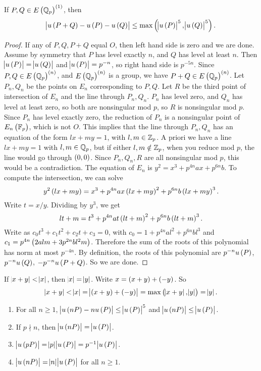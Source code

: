 \begin{lemma}
\label{lem:7.5}
If $ P, Q \in E\br{\Q_p}^{\br{1}} $, then
$$ \abs{u\br{P + Q} - u\br{P} - u\br{Q}} \le \max\br{\abs{u\br{P}}^5, \abs{u\br{Q}}^5}. $$
\end{lemma}

\begin{proof}
If any of $ P, Q, P + Q $ equal $ O $, then left hand side is zero and we are done. Assume by symmetry that $ P $ has level exactly $ n $, and $ Q $ has level at least $ n $. Then $ \abs{u\br{P}} = \abs{u\br{Q}} $ and $ \abs{u\br{P}} = p^{-n} $, so right hand side is $ p^{-5n} $. Since $ P, Q \in E\br{\Q_p}^{\br{n}} $, and $ E\br{\Q_p}^{\br{n}} $ is a group, we have $ P + Q \in E\br{\Q_p}^{\br{n}} $. Let $ P_n, Q_n $ be the points on $ E_n $ corresponding to $ P, Q $. Let $ R $ be the third point of intersection of $ E_n $ and the line through $ P_n, Q_n $. $ P_n $ has level zero, and $ Q_n $ has level at least zero, so both are nonsingular mod $ p $, so $ R $ is nonsingular mod $ p $. Since $ P_n $ has level exactly zero, the reduction of $ P_n $ is a nonsingular point of $ E_n\br{\F_p} $, which is not $ O $. This implies that the line through $ P_n, Q_n $ has an equation of the form $ lx + my = 1 $, with $ l, m \in \mathbb{Z}_p $. A priori we have a line $ lx + my = 1 $ with $ l, m \in \mathbb{Q}_p $, but if either $ l, m \notin \mathbb{Z}_p $, when you reduce mod $ p $, the line would go through $ \br{0, 0} $. Since $ P_n, Q_n, R $ are all nonsingular mod $ p $, this would be a contradiction. The equation of $ E_n $ is $ y^2 = x^3 + p^{4n}ax + p^{6n}b $. To compute the intersection, we can solve
$$ y^2\br{lx + my} = x^3 + p^{4n}ax\br{lx + my}^2 + p^{6n}b\br{lx + my}^3. $$
Write $ t = x / y $. Dividing by $ y^3 $, we get
$$ lt + m = t^3 + p^{4n}at\br{lt + m}^2 + p^{6n}b\br{lt + m}^3. $$
Write as $ c_0t^3 + c_1t^2 + c_2t + c_3 = 0 $, with $ c_0 = 1 + p^{4n}al^2 + p^{6n}bl^3 $ and $ c_1 = p^{4n}\br{2alm + 3p^{2n}bl^2m} $. Therefore the sum of the roots of this polynomial has norm at most $ p^{-4n} $. By definition, the roots of this polynomial are $ p^{-n}u\br{P} $, $ p^{-n}u\br{Q} $, $ -p^{-n}u\br{P + Q} $. So we are done.
\end{proof}


If $ \abs{x + y} < \abs{x} $, then $ \abs{x} = \abs{y} $. Write $ x = \br{x + y} + \br{-y} $. So
$$ \abs{x + y} < \abs{x} = \abs{\br{x + y} + \br{-y}} = \max\br{\abs{x + y}, \abs{y}} = \abs{y}. $$

\begin{corollary}
\hfill
\begin{enumerate}
\item For all $ n \ge 1 $, $ \abs{u\br{nP} - nu\br{P}} \le \abs{u\br{P}}^5 $ and $ \abs{u\br{nP}} \le \abs{u\br{P}} $.
\item If $ p \nmid n $, then $ \abs{u\br{nP}} = \abs{u\br{P}} $.
\item $ \abs{u\br{pP}} = \abs{p}\abs{u\br{P}} = p^{-1}\abs{u\br{P}} $.
\item $ \abs{u\br{nP}} = \abs{n}\abs{u\br{P}} $ for all $ n \ge 1 $.
\end{enumerate}
\end{corollary}

